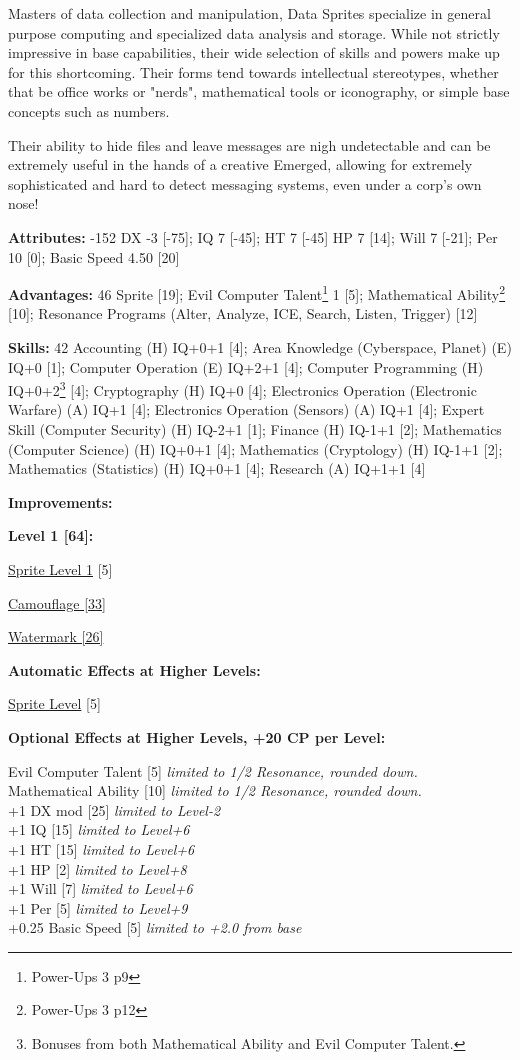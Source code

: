 \begin{multicols*}{3}
Masters of data collection and manipulation, Data Sprites specialize in general purpose computing and specialized data analysis and storage. While not strictly impressive in base capabilities, their wide selection of skills and powers make up for this shortcoming. Their forms tend towards intellectual stereotypes, whether that be office works or "nerds", mathematical tools or iconography, or simple base concepts such as numbers.

Their ability to hide files and leave messages are nigh undetectable and can be extremely useful in the hands of a creative Emerged, allowing for extremely sophisticated and hard to detect messaging systems, even under a corp's own nose!

\textbf{Attributes:} -152
DX -3 [-75]; IQ 7 [-45]; HT 7 [-45]
HP 7 [14]; Will 7 [-21]; Per 10 [0]; Basic Speed 4.50 [20]

\textbf{Advantages:} 46
Sprite [19]; Evil Computer Talent\footnote{Power-Ups 3 p9} 1 [5]; Mathematical Ability\footnote{Power-Ups 3 p12} [10]; Resonance Programs (Alter, Analyze, ICE, Search, Listen, Trigger) [12]

\textbf{Skills:} 42
Accounting (H) IQ+0+1 [4]; Area Knowledge (Cyberspace, Planet) (E) IQ+0 [1]; Computer Operation (E) IQ+2+1 [4]; Computer Programming (H) IQ+0+2\footnote{Bonuses from both Mathematical Ability and Evil Computer Talent.} [4]; Cryptography (H) IQ+0 [4]; Electronics Operation (Electronic Warfare) (A) IQ+1 [4]; Electronics Operation (Sensors) (A) IQ+1 [4]; Expert Skill (Computer Security) (H) IQ-2+1 [1]; Finance (H) IQ-1+1 [2]; Mathematics (Computer Science) (H) IQ+0+1 [4]; Mathematics (Cryptology) (H) IQ-1+1 [2]; Mathematics (Statistics) (H) IQ+0+1 [4]; Research (A) IQ+1+1 [4] 

\textbf{Improvements:}

\textbf{Level 1 [64]:}

\hyperref[sprite_level]{Sprite Level 1} [5]

\hyperref[camouflage]{Camouflage [33]}

\hyperref[watermark]{Watermark [26]}

\textbf{Automatic Effects at Higher Levels:}

\hyperref[sprite_level]{Sprite Level} [5]

\textbf{Optional Effects at Higher Levels, +20 CP per Level:}

Evil Computer Talent [5] \textit{limited to 1/2 Resonance, rounded down.}\\
Mathematical Ability [10] \textit{limited to 1/2 Resonance, rounded down.}\\
+1 DX mod [25] \textit{limited to Level-2}\\
+1 IQ [15] \textit{limited to Level+6}\\
+1 HT [15] \textit{limited to Level+6}\\
+1 HP [2] \textit{limited to Level+8}\\
+1 Will [7] \textit{limited to Level+6}\\
+1 Per [5] \textit{limited to Level+9}\\
+0.25 Basic Speed [5] \textit{limited to +2.0 from base}\\


\end{multicols*}
